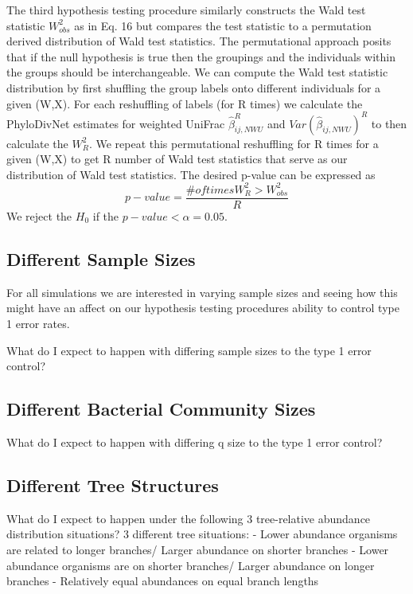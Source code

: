 \documentclass{article}
\begin{document}
The third hypothesis testing procedure similarly constructs the Wald test statistic $W_{obs}^{2}$  as in Eq. 16 but compares the test statistic to a permutation derived distribution of Wald test statistics. The permutational approach posits that if the null hypothesis is true then the groupings and the individuals within the groups should be interchangeable. We can compute the Wald test statistic distribution by first shuffling the group labels onto different individuals for a given (W,X). For each reshuffling of labels (for R times) we calculate the PhyloDivNet estimates for weighted UniFrac $\hat{\beta}_{ij,NWU}^{R}$ and $Var(\hat{\beta}_{ij,NWU})^{R}$ to then calculate the $W_{R}^2$. We repeat this permutational reshuffling for R times for a given (W,X) to get R number of Wald test statistics that serve as our distribution of Wald test statistics. The desired p-value can be expressed as
\begin{equation}
  p-value = \frac{\# of times W_{R}^2 > W_{obs}^{2}}{R}
\end{equation}
We reject the $H_0$ if the $p-value < \alpha = 0.05$.

\subsection{Different Sample Sizes}
For all simulations we are interested in varying sample sizes and seeing how this might have an affect on our hypothesis testing procedures ability to control type 1 error rates.

What do I expect to happen with differing sample sizes to the type 1 error control?


\subsection{Different Bacterial Community Sizes}
What do I expect to happen with differing q size to the type 1 error control?

\subsection{Different Tree Structures}
What do I expect to happen under the following 3 tree-relative abundance distribution situations?
3 different tree situations:
- Lower abundance organisms are related to longer branches/ Larger abundance on shorter branches
- Lower abundance organisms are on shorter branches/ Larger abundance on longer branches
- Relatively equal abundances on equal branch lengths
\end{document}
